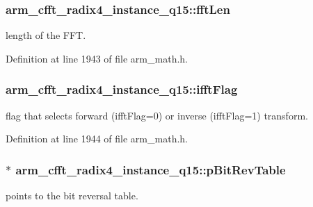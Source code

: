 \hypertarget{structarm__cfft__radix4__instance__q15_a5fc543e7d84ca8cb7cf6648970f21ca6}{
\subsubsection[{fft\-Len}]{ arm\-\_\-cfft\-\_\-radix4\-\_\-instance\-\_\-q15\-::fft\-Len}}\label{structarm__cfft__radix4__instance__q15_a5fc543e7d84ca8cb7cf6648970f21ca6}
length of the F\-F\-T. 

Definition at line 1943 of file arm\-\_\-math.\-h.

\hypertarget{structarm__cfft__radix4__instance__q15_a2ecff6ea735cb4d22e922d0fd5736655}{
\subsubsection[{ifft\-Flag}]{ arm\-\_\-cfft\-\_\-radix4\-\_\-instance\-\_\-q15\-::ifft\-Flag}}\label{structarm__cfft__radix4__instance__q15_a2ecff6ea735cb4d22e922d0fd5736655}
flag that selects forward (ifft\-Flag=0) or inverse (ifft\-Flag=1) transform. 

Definition at line 1944 of file arm\-\_\-math.\-h.

\hypertarget{structarm__cfft__radix4__instance__q15_a4acf704ae0cf30b53bf0fbfae8e34a59}{
\subsubsection[{p\-Bit\-Rev\-Table}]{$\ast$ arm\-\_\-cfft\-\_\-radix4\-\_\-instance\-\_\-q15\-::p\-Bit\-Rev\-Table}}\label{structarm__cfft__radix4__instance__q15_a4acf704ae0cf30b53bf0fbfae8e34a59}
points to the bit reversal table. 

